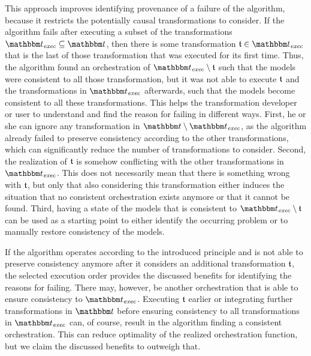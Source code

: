 This approach improves identifying provenance of a failure of the algorithm, because it restricts the potentially causal transformations to consider.
If the algorithm fails after executing a subset of the transformations $\transformationset{T}_\mathvariable{exec} \subseteq \transformationset{T}$,
then there is some transformation $\transformation{t} \in \transformationset{T}_\mathvariable{exec}$ that is the last of those transformation that was executed for its first time.
Thus, the algorithm found an orchestration of $\transformationset{T}_\mathvariable{exec} \setminus \transformation{t}$ such that the models were consistent to all those transformation, but it was not able to execute $\transformation{t}$ and the transformations in $\transformationset{T}_\mathvariable{exec}$ afterwards, such that the models become consistent to all these transformations.
This helps the transformation developer or user to understand and find the reason for failing in different ways.
First, he or she can ignore any transformation in $\transformationset{T} \setminus \transformationset{T}_\mathvariable{exec}$, as the algorithm already failed to preserve consistency according to the other transformations, which can significantly reduce the number of transformations to consider.
Second, the realization of $\transformation{t}$ is somehow conflicting with the other transformations in $\transformationset{T}_\mathvariable{exec}$. This does not necessarily mean that there is something wrong with $\transformation{t}$, but only that also considering this transformation either induces the situation that no consistent orchestration exists anymore or that it cannot be found.
Third, having a state of the models that is consistent to $\transformationset{T}_\mathvariable{exec} \setminus \transformation{t}$ can be used as a starting point to either identify the occurring problem or to manually restore consistency of the models.

If the algorithm operates according to the introduced principle and is not able to preserve consistency anymore after it considers an additional transformation $\transformation{t}$, the selected execution order provides the discussed benefits for identifying the reasons for failing.
There may, however, be another orchestration that is able to ensure consistency to $\transformationset{T}_\mathvariable{exec}$. Executing $\transformation{t}$ earlier or integrating further transformations in $\transformationset{T}$ before ensuring consistency to all transformations in $\transformationset{T}_\mathvariable{exec}$ can, of course, result in the algorithm finding a consistent orchestration.
This can reduce optimality of the realized orchestration function, but we claim the discussed benefits to outweigh that.

